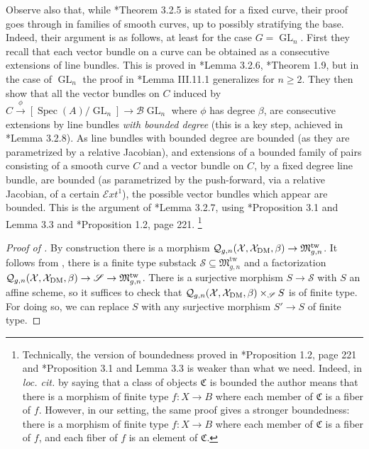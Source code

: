 \documentclass{amsart}
\newcommand{\sS}{\mathscr{S}}
\newcommand{\cB}{\mathcal{B}}
\newcommand{\cE}{\mathcal{E}}
\newcommand{\cQ}{\mathcal{Q}}
\newcommand{\cX}{\mathcal{X}}
\newcommand{\spec}{\operatorname{Spec}}
\newcommand{\GL}{\operatorname{GL}}
\newcommand{\dm}{{\rm DM}}
\theoremstyle{definition}
\theoremstyle{definition}
\begin{document}
{    Observe also that, while \cite{ciocan2014stable}*{Theorem 3.2.5} is stated for a fixed curve, their proof goes through in families of smooth curves, up to possibly stratifying the base. Indeed, their argument is as follows, at least for the case $G=\GL_n$. First they recall that each vector bundle on a curve can be obtained as a consecutive extensions of line bundles.
    This is proved in \cite{ciocan2014stable}*{Lemma 3.2.6}, \cite{seshadri1972quotient}*{Theorem 1.9}, but in the case of $\GL_n$ the proof in \cite{beauville1996complex}*{Lemma III.11.1} generalizes for $n\ge 2$. They then show that all the vector bundles on $C$ induced by $C\xrightarrow{\phi} [\spec(A)/\GL_n]\to \cB \GL_n$ where $\phi$ has degree $\beta$, are consecutive extensions by line bundles \textit{with bounded degree} (this is a key step, achieved in \cite{ciocan2014stable}*{Lemma 3.2.8}). As line bundles with bounded degree are bounded (as they are parametrized by a relative Jacobian), and extensions of a bounded family of
    pairs consisting of a smooth curve $C$ and a vector bundle on $C$, by a fixed degree line bundle, are bounded (as parametrized by the push-forward, via a relative Jacobian, of a certain $\cE xt^1$), the possible vector bundles which appear are bounded.
    This is the argument of \cite{ciocan2014stable}*{Lemma 3.2.7},  using \cite{holla2001generalisation}*{Proposition 3.1 and Lemma 3.3} and \cite{grothendieck1957fondements}*{Proposition 1.2, page 221}. \footnote{Technically, the version of boundedness proved in \cite{grothendieck1957fondements}*{Proposition 1.2, page 221} and \cite{holla2001generalisation}*{Proposition 3.1 and Lemma 3.3} is weaker than what we need. Indeed, in \textit{loc. cit.} by saying that a class of objects $\mathfrak{C}$ is bounded the author means that there is a morphism of finite type $f:X\to B$ where each member of $\mathfrak{C}$ is a fiber of $f$. However, in our setting, the same proof gives a stronger boundedness: there is a morphism of finite type $f:X\to B$ where each member of $\mathfrak{C}$ is a fiber of $f$, and each fiber of $f$ is an element of $\mathfrak{C}$.} 

    
    \begin{proof}[Proof of ]
        By construction there is a morphism $\cQ_{g,n}(\cX, \cX_\dm,\beta)\to \mathfrak{M}_{g,n}^{\operatorname{tw}}$. It follows from ,
        there is a finite type substack $\sS\subseteq \mathfrak{M}_{g,n}^{\operatorname{tw}}$ and a factorization $\cQ_{g,n}(\cX, \cX_\dm,\beta)\to \sS\to  \mathfrak{M}_{g,n}^{\operatorname{tw}}$.
        There is a surjective morphism $S\to \sS$ with $S$
         an affine scheme, so it suffices to check that $\cQ_{g,n}(\cX,\cX_\dm,\beta)\times_\sS S$ is of finite type. For doing so, we can replace $S$ with any surjective morphism $S'\to S$ of finite type.         
         

\end{proof}}
\end{document}
